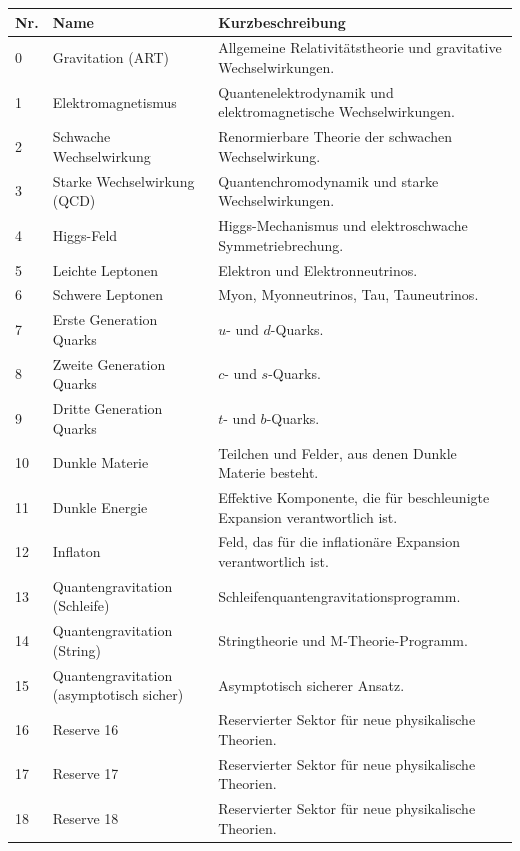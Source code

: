 \documentclass[13pt,a4paper]{article}
\begin{document}
	\begin{longtable}{|p{0.9cm}|p{6.0cm}|p{8.6cm}|}
		\hline
		\textbf{Nr.} & \textbf{Name} & \textbf{Kurzbeschreibung} \\
		\hline
		\endhead
		0 & Gravitation (ART) & Allgemeine Relativitätstheorie und gravitative Wechselwirkungen. \\
		\hline
		1 & Elektromagnetismus & Quantenelektrodynamik und elektromagnetische Wechselwirkungen. \\
		\hline
		2 & Schwache Wechselwirkung & Renormierbare Theorie der schwachen Wechselwirkung. \\
		\hline
		3 & Starke Wechselwirkung (QCD) & Quantenchromodynamik und starke Wechselwirkungen. \\
		\hline
		4 & Higgs-Feld & Higgs-Mechanismus und elektroschwache Symmetriebrechung. \\
		\hline
		5 & Leichte Leptonen & Elektron und Elektronneutrinos. \\
		\hline
		6 & Schwere Leptonen & Myon, Myonneutrinos, Tau, Tauneutrinos. \\
		\hline
		7 & Erste Generation Quarks & $u$- und $d$-Quarks. \\
		\hline
		8 & Zweite Generation Quarks & $c$- und $s$-Quarks. \\
		\hline
		9 & Dritte Generation Quarks & $t$- und $b$-Quarks. \\
		\hline
		10 & Dunkle Materie & Teilchen und Felder, aus denen Dunkle Materie besteht. \\
		\hline
		11 & Dunkle Energie & Effektive Komponente, die für beschleunigte Expansion verantwortlich ist. \\
		\hline
		12 & Inflaton & Feld, das für die inflationäre Expansion verantwortlich ist. \\
		\hline
		13 & Quantengravitation (Schleife) & Schleifenquantengravitationsprogramm. \\
		\hline
		14 & Quantengravitation (String) & Stringtheorie und M-Theorie-Programm. \\
		\hline
		15 & Quantengravitation (asymptotisch sicher) & Asymptotisch sicherer Ansatz. \\
		\hline
		16 & Reserve 16 & Reservierter Sektor für neue physikalische Theorien. \\
		\hline
		17 & Reserve 17 & Reservierter Sektor für neue physikalische Theorien. \\
		\hline
		18 & Reserve 18 & Reservierter Sektor für neue physikalische Theorien. \\

\end{longtable}
\end{document}
